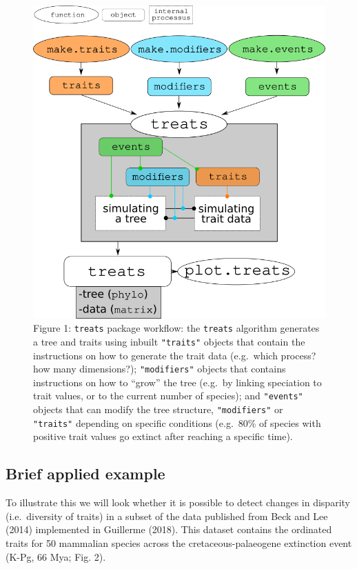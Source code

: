 \documentclass[
]{article}
\begin{document}
\begin{figure}
\hypertarget{figure1}{%
\centering
\includegraphics{../inst/gitbook/treats_structure.png}
\caption{Figure 1: \texttt{treats} package workflow: the \texttt{treats}
algorithm generates a tree and traits using inbuilt \texttt{"traits"}
objects that contain the instructions on how to generate the trait data
(e.g.~which process? how many dimensions?); \texttt{"modifiers"} objects
that contains instructions on how to ``grow'' the tree (e.g.~by linking
speciation to trait values, or to the current number of species); and
\texttt{"events"} objects that can modify the tree structure,
\texttt{"modifiers"} or \texttt{"traits"} depending on specific
conditions (e.g.~80\% of species with positive trait values go extinct
after reaching a specific time).}\label{figure1}
}
\end{figure}

\hypertarget{brief-applied-example}{%
\subsection{Brief applied example}\label{brief-applied-example}}

To illustrate this we will look whether it is possible to detect changes
in disparity (i.e.~diversity of traits) in a subset of the data
published from Beck and Lee (2014) implemented in Guillerme (2018). This
dataset contains the ordinated traits for 50 mammalian species across
the cretaceous-palaeogene extinction event (K-Pg, 66 Mya; Fig. 2).
\end{document}
